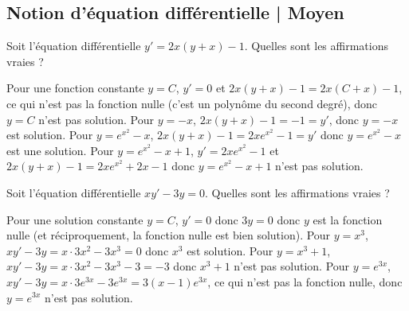 \subsection{Notion d'équation différentielle | Moyen}

\begin{question}
Soit l'équation différentielle $y'=2x(y+x)-1$. Quelles sont les affirmations vraies ?

\begin{answers}
\end{answers}
\begin{explanations} Pour une fonction constante $y=C$, $y'=0$ et $2x(y+x)-1=2x(C+x)-1$, ce qui n'est pas la fonction nulle (c'est un polynôme du second degré), donc $y=C$ n'est pas solution. Pour $y=-x$, $2x(y+x)-1=-1=y'$, donc $y=-x$ est solution. Pour $y= e^{x^2}-x$, $2x(y+x)-1=2x e^{x^2}-1=y'$ donc $y= e^{x^2}-x$ est une solution. Pour $y= e^{x^2}-x+1$, $y'=2x e^{x^2}-1$ et  $2x(y+x)-1=2x e^{x^2}+2x-1$ donc $y= e^{x^2}-x+1$ n'est pas solution.
\end{explanations}
\end{question}


\begin{question}
Soit l'équation différentielle $xy'-3y=0$. Quelles sont les affirmations vraies ?
\begin{answers}
\end{answers}
\begin{explanations}
Pour une solution constante $y=C$, $y'=0$ donc $3y=0$ donc $y$ est la fonction nulle (et réciproquement, la fonction nulle est bien solution). Pour $y=x^3$, $xy'-3y=x \cdot  3x^2-3x^3=0$ donc $x^3$ est solution. Pour $y=x^3+1$, $xy'-3y=x \cdot 3x^2-3x^3-3=-3$ donc $x^3+1$ n'est pas solution. Pour $y= e^{3x}$, $xy'-3y=x \cdot 3 e^{3x}-3 e^{3x}=3(x-1) e^{3x}$, ce qui n'est pas la fonction nulle, donc $y= e^{3x}$ n'est pas solution.
\end{explanations}
\end{question}



